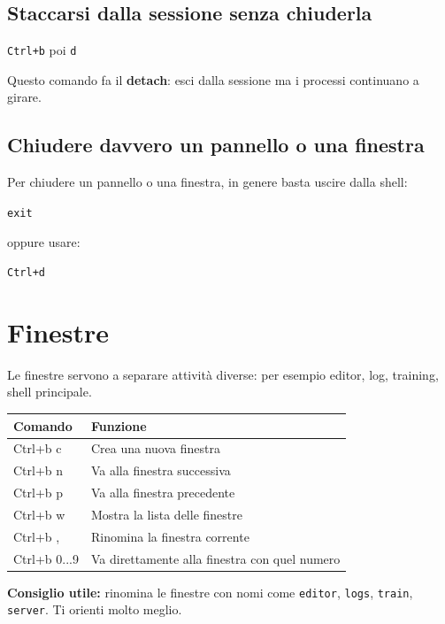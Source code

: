 \documentclass[a4paper,11pt]{article}
\begin{document}
\subsection{Staccarsi dalla sessione senza chiuderla}
\begin{codebox}
\texttt{Ctrl+b} poi \texttt{d}
\end{codebox}

Questo comando fa il \textbf{detach}: esci dalla sessione ma i processi continuano a girare.

\subsection{Chiudere davvero un pannello o una finestra}
Per chiudere un pannello o una finestra, in genere basta uscire dalla shell:
\begin{codebox}
\texttt{exit}
\end{codebox}

oppure usare:
\begin{codebox}
\texttt{Ctrl+d}
\end{codebox}

\section{Finestre}
Le finestre servono a separare attività diverse: per esempio editor, log, training, shell principale.

\begin{center}
\renewcommand{\arraystretch}{1.3}
\begin{tabularx}{\textwidth}{>{\ttfamily}l X}
\toprule
Comando & Funzione \\
\midrule
Ctrl+b c & Crea una nuova finestra \\
Ctrl+b n & Va alla finestra successiva \\
Ctrl+b p & Va alla finestra precedente \\
Ctrl+b w & Mostra la lista delle finestre \\
Ctrl+b , & Rinomina la finestra corrente \\
Ctrl+b 0...9 & Va direttamente alla finestra con quel numero \\
\bottomrule
\end{tabularx}
\end{center}

\begin{tipbox}
\textbf{Consiglio utile:} rinomina le finestre con nomi come \texttt{editor}, \texttt{logs}, \texttt{train}, \texttt{server}. Ti orienti molto meglio.
\end{tipbox}
\end{document}
